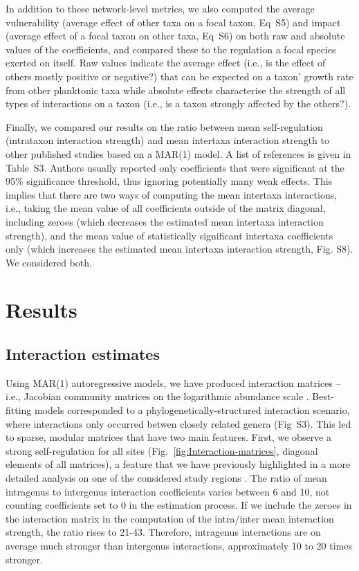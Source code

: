 \documentclass[10pt]{article}
\begin{document}
In addition to these network-level metrics, we also computed the average
vulnerability (average effect of other taxa on a focal taxon, Eq~S5)
and impact (average effect of a focal taxon on other taxa, Eq~S6)
on both raw and absolute values of the coefficients, and compared
these to the regulation a focal species exerted on itself. Raw values
indicate the average effect (i.e., is the effect of others mostly
positive or negative?) that can be expected on a taxon' growth rate
from other planktonic taxa while absolute effects characterise
the strength of all types of interactions on a taxon (i.e., is a taxon
strongly affected by the others?).

Finally, we compared our results on the ratio between mean self-regulation
(intrataxon interaction strength) and mean intertaxa interaction strength
to other published studies based on a MAR(1) model. A list of references
is given in Table~S3. Authors usually reported only coefficients
that were significant at the 95\% significance threshold, thus ignoring
potentially many weak effects. This implies that there are two ways
of computing the mean intertaxa interactions, i.e., taking the mean
value of all coefficients outside of the matrix diagonal, including
zeroes (which decreases the estimated mean intertaxa interaction strength),
and the mean value of statistically significant intertaxa coefficients
only (which increases the estimated mean intertaxa interaction strength,
Fig. S8). We considered both. 

\section*{Results}

\subsection*{Interaction estimates}

Using MAR(1) autoregressive models, we have produced interaction matrices
\citep{ives_estimating_2003,hampton2013quantifying} -- i.e., Jacobian
community matrices on the logarithmic abundance scale \citep{ives_estimating_2003}.
Best-fitting models corresponded to a phylogenetically-structured
interaction scenario, where interactions only occurred betwen closely
related genera (Fig~S3). This led to sparse, modular matrices that
have two main features. First, we observe a strong self-regulation
for all sites (Fig.~\ref{fig:Interaction-matrices}, diagonal elements
of all matrices), a feature that we have previously highlighted in
a more detailed analysis on one of the considered study regions \citep{barraquand_coastal_2018}.
The ratio of mean intragenus to intergenus interaction coefficients
varies between 6 and 10, not counting coefficients set to 0 in the
estimation process. If we include the zeroes in the interaction matrix
in the computation of the intra/inter mean interaction strength, the
ratio rises to 21-43. Therefore, intragenus interactions are on average
much stronger than intergenus interactions, approximately 10 to 20
times stronger.
\end{document}
